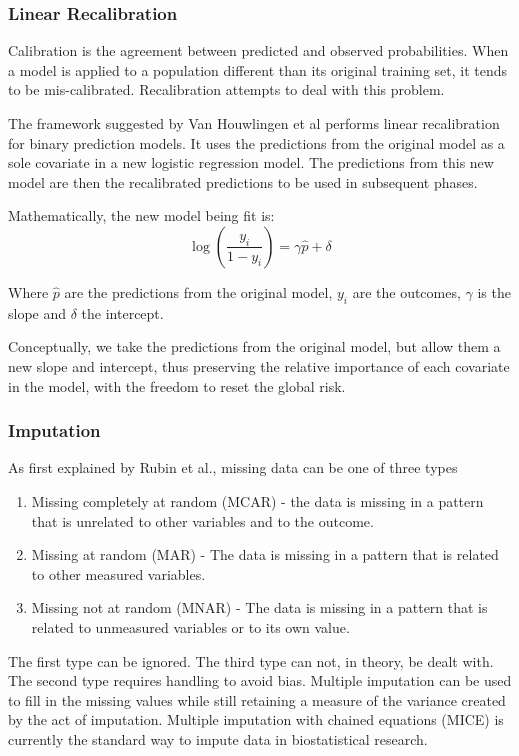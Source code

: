 \documentclass[a4paper,12pt]{article}
\begin{document}
		\subsubsection{Linear Recalibration}
		Calibration is the agreement between predicted and observed probabilities. When a model is applied to a population different than its original training set, it tends to be mis-calibrated. Recalibration attempts to deal with this problem.
		
		The framework suggested by Van Houwlingen et al\cite{Houwelingen2000} performs linear recalibration for binary prediction models. It uses the predictions from the original model as a sole covariate in a new logistic regression model. The predictions from this new model are then the recalibrated predictions to be used in subsequent phases.
				
		Mathematically, the new model being fit is:
		\begin{equation*}
		\log(\frac{y_i}{1-y_i}) = \gamma \hat{p} + \delta
		\end{equation*}
		
		Where $ \hat{p} $ are the predictions from the original model, $ y_i $ are the outcomes, $ \gamma $ is the slope and $ \delta $ the intercept.
		
		Conceptually, we take the predictions from the original model, but allow them a new slope and intercept, thus preserving the relative importance of each covariate in the model, with the freedom to reset the global risk.
		
		\subsubsection{Imputation}
		As first explained by Rubin et al.\cite{Rubin1987}, missing data can be one of three types
		\begin{enumerate}
			\item Missing completely at random (MCAR) - the data is missing in a pattern that is unrelated to other variables and to the outcome.
			\item Missing at random (MAR) - The data is missing in a pattern that is related to other measured variables.
			\item Missing not at random (MNAR) - The data is missing in a pattern that is related to unmeasured variables or to its own value.
		\end{enumerate}
		The first type can be ignored. The third type can not, in theory, be dealt with. The second type requires handling to avoid bias. Multiple imputation can be used to fill in the missing values while still retaining a measure of the variance created by the act of imputation\cite{Rubin1987}. Multiple imputation with chained equations (MICE) is currently the standard way to impute data in biostatistical research\cite{Buuren2011}.
		
\end{document}
